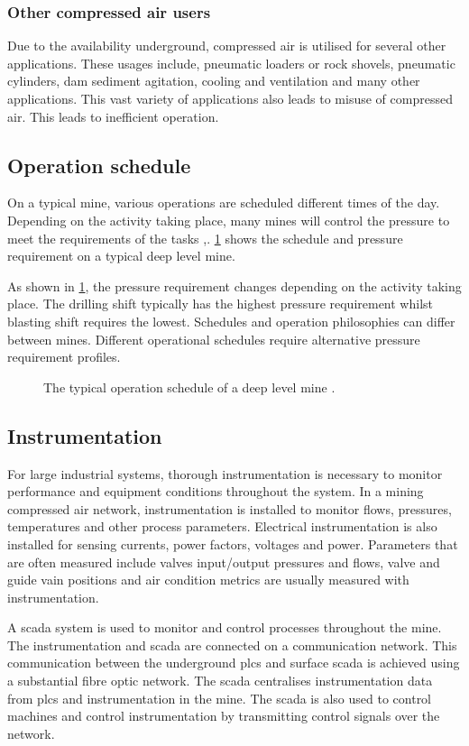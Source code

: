 \subsubsection{Other compressed air users}
Due to the availability underground, compressed air is utilised for several other applications. These usages include, pneumatic loaders or rock shovels, pneumatic cylinders, dam sediment agitation, cooling and ventilation and many other applications. This vast variety of applications also leads to misuse of compressed air. This leads to inefficient operation.
\subsection{Operation schedule}
On a typical mine, various operations are scheduled different times of the day. Depending on the activity taking place, many mines will control the pressure to meet the requirements of the tasks \cite{Kriel2014Masters},\cite{Marais2012PhD}. \cref{fig: Mining schedule} shows the schedule and pressure requirement on a typical deep level mine.\par 
As shown in \cref{fig: Mining schedule}, the pressure requirement changes depending on the activity taking place. The drilling shift typically has the highest pressure requirement whilst blasting shift requires the lowest. Schedules and operation philosophies can differ between mines. Different operational schedules require alternative pressure requirement profiles.
\begin{figure}[h]
	\centering
	\fbox{}
	\caption[A typical operation schedule of a deep level mine.]{The typical operation schedule of a deep level mine \cite{Kriel2014Masters}.}
	\label{fig: Mining schedule}
\end{figure}
\subsection{Instrumentation}
For large industrial systems, thorough instrumentation is necessary to monitor performance and equipment conditions throughout the system. In a mining compressed air network, instrumentation is installed to monitor flows, pressures, temperatures and other process parameters. Electrical instrumentation is also installed for sensing currents, power factors, voltages and power. Parameters that are often measured include valves input/output pressures and flows, valve and guide vain positions and air condition metrics are usually measured with instrumentation.	
\par
A \gls{scada} system is used to monitor and control processes throughout the mine. The instrumentation and \gls{scada} are connected on a communication network.
This communication between the underground \glspl{plc} and surface \gls{scada} is achieved using a substantial fibre optic network\cite{schroeder2009energy}. The \gls{scada} centralises instrumentation data from \glspl{plc} and instrumentation in  the mine. The \gls{scada} is also used to control machines and control instrumentation by transmitting control signals over the network.  
